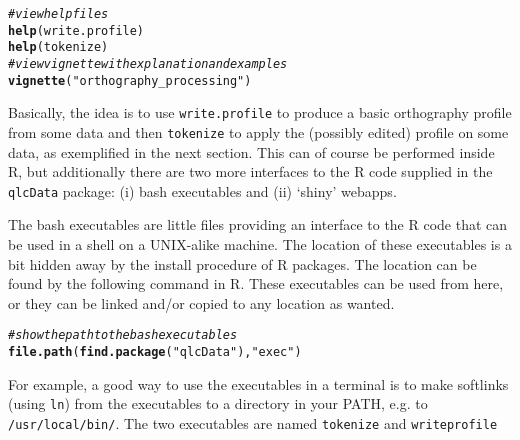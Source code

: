 \documentclass[output=inprep,
		biblatex
		]{LSP/langsci}\usepackage[]{graphicx}\usepackage[]{color}
\makeatletter
\newcommand{\hlstr}[1]{\textcolor[rgb]{0.192,0.494,0.8}{#1}}%
\newcommand{\hlcom}[1]{\textcolor[rgb]{0.678,0.584,0.686}{\textit{#1}}}%
\newcommand{\hlstd}[1]{\textcolor[rgb]{0.345,0.345,0.345}{#1}}%
\newcommand{\hlkwd}[1]{\textcolor[rgb]{0.737,0.353,0.396}{\textbf{#1}}}%
\newenvironment{kframe}{%
 \def\at@end@of@kframe{}%
 \ifinner\ifhmode%
  \def\at@end@of@kframe{\end{minipage}}%
  \begin{minipage}{\columnwidth}%
 \fi\fi%
 \def\FrameCommand##1{\hskip\@totalleftmargin \hskip-\fboxsep
 \colorbox{shadecolor}{##1}\hskip-\fboxsep
     \hskip-\linewidth \hskip-\@totalleftmargin \hskip\columnwidth}%
 \MakeFramed {\advance\hsize-\width
   \@totalleftmargin\z@ \linewidth\hsize
   \@setminipage}}%
 {\par\unskip\endMakeFramed%
 \at@end@of@kframe}
\newenvironment{knitrout}{}{} %
\makeatother
\begin{document}
\begin{knitrout}\footnotesize
{}\color{fgcolor}\begin{kframe}
\begin{alltt}
\hlcom{# view help files}
\hlkwd{help}\hlstd{(write.profile)}
\hlkwd{help}\hlstd{(tokenize)}
\hlcom{# view vignette with explanation and examples}
\hlkwd{vignette}\hlstd{(}\hlstr{"orthography_processing"}\hlstd{)}
\end{alltt}
\end{kframe}
\end{knitrout}

\noindent Basically, the idea is to use \texttt{write.profile} to produce a
basic orthography profile from some data and then \texttt{tokenize} to apply the
(possibly edited) profile on some data, as exemplified in the next section. This
can of course be performed inside R, but additionally there are two more
interfaces to the R code supplied in the \texttt{qlcData} package: (i) bash
executables and (ii) `shiny' webapps.

The bash executables are little files providing an interface to the R code that
can be used in a shell on a UNIX-alike machine. The location of these
executables is a bit hidden away by the install procedure of R packages. The
location can be found by the following command in R. These executables can be 
used from here, or they can be linked and/or copied to any location as wanted.

\begin{knitrout}\footnotesize
{}\color{fgcolor}\begin{kframe}
\begin{alltt}
\hlcom{# show the path to the bash executables}
\hlkwd{file.path}\hlstd{(}\hlkwd{find.package}\hlstd{(}\hlstr{"qlcData"}\hlstd{),} \hlstr{"exec"}\hlstd{)}
\end{alltt}
\end{kframe}
\end{knitrout}

\noindent For example, a good way to use the executables in a terminal is to
make softlinks (using \texttt{ln}) from the executables to a directory in your
PATH, e.g. to \texttt{/usr/local/bin/}. The two executables are named
\texttt{tokenize} and \texttt{writeprofile}
\end{document}
